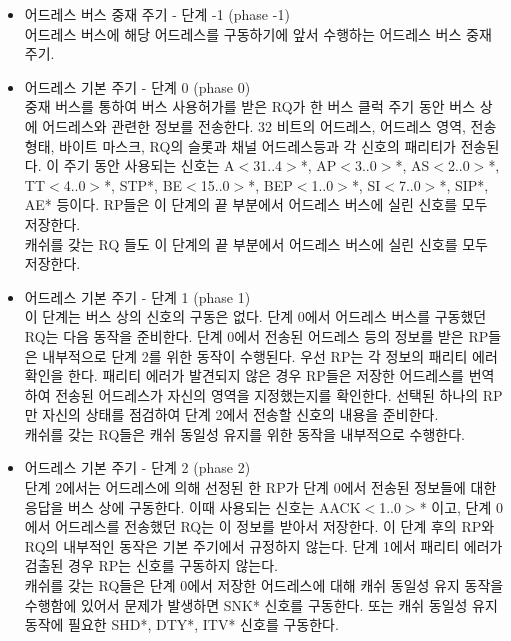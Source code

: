 \begin{itemize}
	\item 어드레스 버스 중재 주기 - 단계 -1 (phase -1)\\
	어드레스 버스에 해당 어드레스를 구동하기에 앞서 수행하는 어드레스 버스 중재 주기.
	\item 어드레스 기본 주기 - 단계 0 (phase 0)\\
	중재 버스를 통하여 버스 사용허가를 받은 RQ가 한 버스 클럭 주기 동안 
	버스 상에 어드레스와 관련한 정보를 전송한다.
	32 비트의 어드레스, 어드레스 영역, 전송 형태, 바이트 마스크, RQ의 슬롯과
	채널 어드레스등과 각 신호의 패리티가 전송된다.
	이 주기 동안 사용되는 신호는 A$<$31..4$>$*, AP$<$3..0$>$*,
	AS$<$2..0$>$*, TT$<$4..0$>$*, STP*,
	BE$<$15..0$>$*, BEP$<$1..0$>$*,
	SI$<$7..0$>$*, SIP*, AE* 등이다.
	RP들은 이 단계의 끝 부분에서 어드레스 버스에 실린 신호를 모두 저장한다. \\
	캐쉬를 갖는 RQ 들도 이 단계의 끝 부분에서 어드레스 버스에 실린 신호를 모두 저장한다.
%
	\item 어드레스 기본 주기 - 단계 1 (phase 1)\\
	이 단계는 버스 상의 신호의 구동은 없다.
	단계 0에서 어드레스 버스를 구동했던 RQ는 다음 동작을 준비한다.
	단계 0에서 전송된 어드레스 등의 정보를 받은 RP들은 내부적으로  단계 2를 위한 동작이 수행된다.
	우선 RP는 각 정보의 패리티 에러 확인을 한다. 패리티 에러가 발견되지 않은 경우
	RP들은 저장한 어드레스를 번역하여 전송된 어드레스가 자신의 영역을 지정했는지를 확인한다.
	선택된 하나의 RP만 자신의 상태를 점검하여 단계 2에서 전송할 신호의 내용을 준비한다. \\
	캐쉬를 갖는 RQ들은 캐쉬 동일성 유지를 위한 동작을 내부적으로 수행한다.
%
	\item 어드레스 기본 주기 - 단계 2 (phase 2)\\
	단계 2에서는 어드레스에 의해 선정된 한 RP가 단계 0에서 전송된 정보들에
	대한 응답을 버스 상에 구동한다. 
	이때 사용되는 신호는 AACK$<$1..0$>$* 이고,
	단계 0에서 어드레스를 전송했던 RQ는 이 정보를 받아서 저장한다.
	이 단계 후의 RP와 RQ의 내부적인 동작은 기본 주기에서 규정하지 않는다.
	단계 1에서 패리티 에러가 검출된 경우 RP는 신호를 구동하지 않는다. \\
	캐쉬를 갖는 RQ들은 단계 0에서 저장한 어드레스에 대해 
	캐쉬 동일성 유지 동작을 수행함에 있어서 문제가 발생하면 SNK* 신호를 구동한다.
	또는 캐쉬 동일성 유지 동작에 필요한 SHD*, DTY*, ITV* 신호를
	구동한다.
\end{itemize}
%
